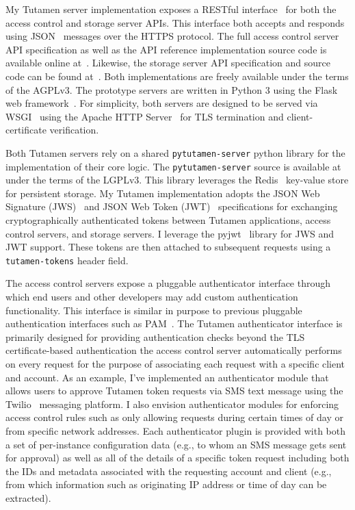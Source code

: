 My Tutamen server implementation exposes a RESTful
interface~\cite{fielding2000} for both the access control and storage
server APIs. This interface both accepts and responds using
JSON~\cite{json} messages over the HTTPS protocol. The full access
control server API specification as well as the API reference
implementation source code is available online
at~\cite{src-tutamen-apiaccesscontrol}. Likewise, the storage server
API specification and source code can be found
at~\cite{src-tutamen-apistorage}. Both implementations are freely
available under the terms of the AGPLv3. The prototype servers are
written in Python 3 using the Flask web
framework~\cite{python-flask}. For simplicity, both servers are
designed to be served via WSGI~\cite{pep3333} using the Apache HTTP
Server~\cite{apache} for TLS termination and client-certificate
verification.

Both Tutamen servers rely on a shared \texttt{pytutamen-server} python
library for the implementation of their core logic. The
\texttt{pytutamen-server} source is available
at~\cite{src-tutamen-pytutamenserver} under the terms of the
LGPLv3. This library leverages the Redis~\cite{redis} key-value store
for persistent storage. My Tutamen implementation adopts the JSON Web
Signature (JWS)~\cite{rfc7515} and JSON Web Token (JWT)~\cite{rfc7519}
specifications for exchanging cryptographically authenticated tokens
between Tutamen applications, access control servers, and storage
servers. I leverage the pyjwt~\cite{pyjwt} library for JWS and JWT
support. These tokens are then attached to subsequent requests using a
\texttt{tutamen-tokens} header field.

The access control servers expose a pluggable authenticator interface
through which end users and other developers may add custom
authentication functionality. This interface is similar in purpose to
previous pluggable authentication interfaces such as
PAM~\cite{samar1996}. The Tutamen authenticator interface is primarily
designed for providing authentication checks beyond the TLS
certificate-based authentication the access control server
automatically performs on every request for the purpose of associating
each request with a specific client and account. As an example, I've
implemented an authenticator module that allows users to approve
Tutamen token requests via SMS text message using the
Twilio~\cite{twilio} messaging platform. I also envision authenticator
modules for enforcing access control rules such as only allowing
requests during certain times of day or from specific network
addresses. Each authenticator plugin is provided with both a set of
per-instance configuration data (e.g., to whom an SMS message gets
sent for approval) as well as all of the details of a specific token
request including both the IDs and metadata associated with the
requesting account and client (e.g., from which information such as
originating IP address or time of day can be extracted).

